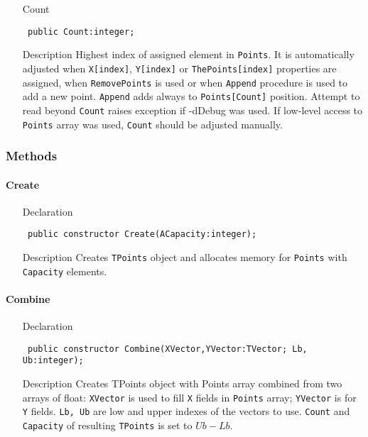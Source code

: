 \documentclass[12pt,a4paper,oneside]{report}
\newcommand{\declarationitem}[1]{{\addfontfeatures{FakeBold=1.3} #1}}
\newcommand{\descriptiontitle}[1]{{\addfontfeatures{FakeSlant}#1}}
\newcommand{\code}[1]{\texttt{#1}}
\begin{document}
\begin{itemize}
\item[\declarationitem{Count}\hfill]
\begin{flushleft}
	\code{
		public Count:integer;}
\end{flushleft}
\item[\descriptiontitle{Description}]	
Highest index of assigned element in \code{Points}. It is automatically adjusted when \code{X[index]}, \code{Y[index]} or \code{ThePoints[index]} properties are assigned, when \code{RemovePoints} is used or when \code{Append} procedure is used to add a new point. \code{Append} adds always to \code{Points[Count]} position. Attempt to read beyond \code{Count} raises exception if -dDebug was used. If low-level access to \code{Points} array was used, \code{Count} should be adjusted manually.
\par  \end{itemize}

\subsubsection{Methods}
\paragraph{Create}\hspace*{\fill}
\label{lmPointsVec.TPoints-Create}
\begin{itemize}\item[\declarationitem{Declaration}\hfill]
	\begin{flushleft}
		\code{
			public constructor Create(ACapacity:integer);}
	\end{flushleft}
	\item[\descriptiontitle{Description}]
	Creates \code{TPoints} object and allocates memory for \code{Points} with \code{Capacity} elements. 
\end{itemize}
\paragraph{Combine}\hspace*{\fill}
\label{lmPointsVec.TPoints-Combine}
\begin{itemize}\item[\declarationitem{Declaration}\hfill]
	\begin{flushleft}
		\code{
			public constructor Combine(XVector,YVector:TVector; Lb, Ub:integer);}
	\end{flushleft}
	\item[\descriptiontitle{Description}]
	Creates TPoints object with Points array combined from two arrays of float: \code{XVector} is used to fill \code{X} fields in \code{Points} array; \code{YVector} is for \code{Y} fields. \code{Lb, Ub} are low and upper indexes of the vectors to use. \code{Count} and \code{Capacity} of resulting \code{TPoints} is set to $Ub-Lb$. 
\end{itemize}
\end{document}
